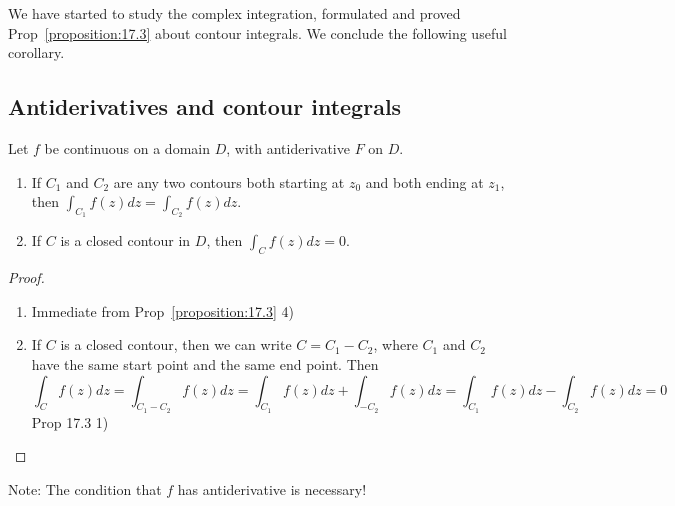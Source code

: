
% 
% 
% 
% 
% 
% 
% 
% 
% 
% 
% 

\graphicspath{{./input/graphs/note09/}}


% 




We have started to study the complex integration, formulated and proved Prop~\ref{proposition:17.3} about contour integrals. We conclude the following useful corollary.

\subsection{Antiderivatives and contour integrals}

\begin{corollary}\label{corollary:17.4}
    Let $f$ be continuous on a domain $D$, with antiderivative $F$ on $D$.
    \begin{enumerate}
        \item If $C_1$ and $C_2$ are any two contours both starting at $z_0$ and both ending at $z_1$, then $\int_{C_1} f(z) dz = \int_{C_2} f(z) dz$.
        \item If $C$ is a closed contour in $D$, then $\int_C f(z) dz = 0$.
    \end{enumerate}
\end{corollary}
\begin{proof}
    \begin{enumerate}
        \item Immediate from Prop~\ref{proposition:17.3} 4)
        \item If $C$ is a closed contour, then we can write $C = C_1 - C_2$, where $C_1$ and $C_2$ have the same start point and the same end point. Then
        \[  \int_C f(z) dz = \int_{C_1 - C_2} f(z) dz = \int_{C_1} f(z) dz + \int_{-C_2} f(z) dz = \int_{C_1} f(z) dz - \int_{C_2} f(z) dz = 0 \]
        Prop 17.3 1)
    \end{enumerate}
    
\end{proof}
Note: The condition that $f$ has antiderivative is necessary!

